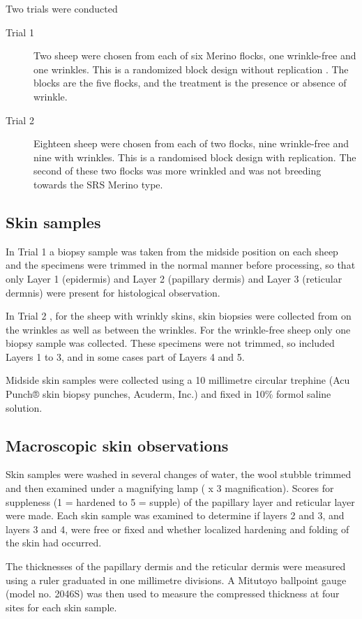 \documentclass[titlepage]{article}  %
\begin{document}
Two trials were conducted
\begin{description}
\item[Trial 1]  Two sheep were chosen from each of six Merino flocks, one wrinkle-free and one wrinkles. This is a randomized block design without replication .  The blocks are the five flocks, and the treatment is the presence or absence of wrinkle.
\item[Trial 2]  Eighteen sheep were chosen from each of two flocks, nine wrinkle-free and nine with wrinkles. This is a randomised block design with replication. The second of these two flocks was more wrinkled and was not breeding towards the SRS Merino type.
\end{description} 
\subsection{Skin samples}
In Trial 1 a biopsy sample was taken from the midside position on each sheep and the specimens were trimmed in the normal manner before processing, so that only Layer 1 (epidermis) and Layer 2 (papillary dermis) and Layer 3 (reticular dermnis) were present for histological observation.

In Trial 2 , for the sheep with wrinkly skins, skin biopsies were collected from on the wrinkles as well as between the wrinkles. For the wrinkle-free sheep only one biopsy sample was collected. These specimens were not trimmed, so included Layers 1 to 3,  and in some cases part of Layers 4 and 5.

Midside skin samples were collected using a 10 millimetre
circular trephine (Acu Punch® skin biopsy punches, Acuderm, Inc.) and
fixed in 10\% formol saline solution. 

\subsection{Macroscopic skin observations}

Skin samples were washed in several changes of water, the wool
stubble trimmed and then examined under a magnifying lamp ( x 3
magnification).  Scores for  suppleness (1 = hardened to 5 = supple)
of the papillary layer and reticular layer  were made.  Each skin
sample was examined to determine if layers 2 and 3, and layers 3 and 4,
were free or fixed and whether localized hardening and folding of the
skin had occurred.

The thicknesses of the papillary dermis and
the reticular dermis were measured using a ruler graduated in one
millimetre divisions. A Mitutoyo ballpoint gauge
(model no. 2046S) was then used to measure the compressed thickness at
four sites for each skin sample.
\end{document}
